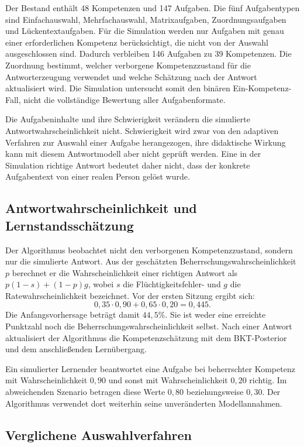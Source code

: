 Der Bestand enthält 48 Kompetenzen und 147 Aufgaben. Die fünf Aufgabentypen
sind Einfachauswahl, Mehrfachauswahl, Matrixaufgaben, Zuordnungsaufgaben und
Lückentextaufgaben. Für die Simulation werden nur Aufgaben mit genau einer
erforderlichen Kompetenz berücksichtigt, die nicht von der Auswahl
ausgeschlossen sind. Dadurch verbleiben 146 Aufgaben zu 39 Kompetenzen.
Die Zuordnung bestimmt, welcher verborgene Kompetenzzustand für die
Antworterzeugung verwendet und welche Schätzung nach der Antwort aktualisiert
wird. Die Simulation untersucht somit den binären Ein-Kompetenz-Fall,
nicht die vollständige Bewertung aller Aufgabenformate.

Die Aufgabeninhalte und ihre Schwierigkeit verändern die simulierte
Antwortwahrscheinlichkeit nicht. Schwierigkeit wird zwar von den adaptiven
Verfahren zur Auswahl einer Aufgabe herangezogen, ihre didaktische Wirkung
kann mit diesem Antwortmodell aber nicht geprüft werden. Eine in der
Simulation richtige Antwort bedeutet daher nicht, dass der konkrete
Aufgabentext von einer realen Person gelöst wurde.

\subsection{Antwortwahrscheinlichkeit und Lernstandsschätzung}

Der Algorithmus beobachtet nicht den verborgenen Kompetenzzustand, sondern
nur die simulierte Antwort. Aus der geschätzten Beherrschungswahrscheinlichkeit
$p$ berechnet er die Wahrscheinlichkeit einer richtigen Antwort als
$p(1-s)+(1-p)g$, wobei $s$ die Flüchtigkeitsfehler- und $g$ die
Ratewahrscheinlichkeit bezeichnet. Vor der ersten Sitzung ergibt sich:
\[
  0{,}35\cdot0{,}90+0{,}65\cdot0{,}20=0{,}445.
\]
Die Anfangsvorhersage beträgt damit $44{,}5\%$. Sie ist weder eine
erreichte Punktzahl noch die Beherrschungswahrscheinlichkeit selbst.
Nach einer Antwort aktualisiert der Algorithmus die Kompetenzschätzung
mit dem BKT-Posterior und dem anschließenden Lernübergang.

Ein simulierter Lernender beantwortet eine Aufgabe bei beherrschter
Kompetenz mit Wahrscheinlichkeit $0{,}90$ und sonst mit Wahrscheinlichkeit
$0{,}20$ richtig. Im abweichenden Szenario betragen diese Werte $0{,}80$
beziehungsweise $0{,}30$. Der Algorithmus verwendet dort weiterhin seine
unveränderten Modellannahmen.

\subsection{Verglichene Auswahlverfahren}


